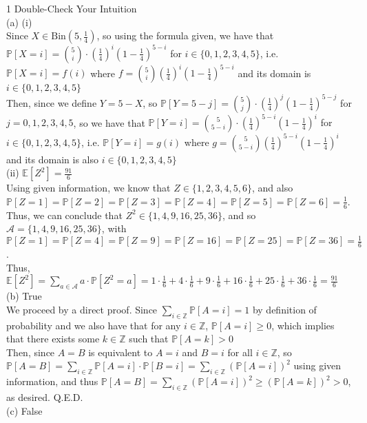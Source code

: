\documentclass{article}
\begin{document}
{\Large 1 Double-Check Your Intuition} \\[.5cm]
{\color{red} (a) (i) } \\

Since $X \in \text{Bin}(5, \frac{1}{4})$, so using the formula given, we have that
{\color{red} $\mathbb{P}[X=i] = \binom{5}{i}\cdot (\frac{1}{4})^i(1 - \frac{1}{4})^{5-i}$ for $i\in \{0,1,2,3,4,5\}$}, i.e.
$\mathbb{P}[X=i] = f(i)$ where $f = \binom{5}{i} (\frac{1}{4})^i(1 - \frac{1}{4})^{5-i}$ and its domain is $i\in \{0,1,2,3,4,5\}$ \\

Then, since we define $Y = 5 - X$, so
$\mathbb{P}[Y=5-j] = \binom{5}{j}\cdot (\frac{1}{4})^j(1 - \frac{1}{4})^{5-j}$ for $j = 0,1,2,3,4,5$, so we have that
{\color{red} $\mathbb{P}[Y=i] = \binom{5}{5-i}\cdot (\frac{1}{4})^{5-i}(1 - \frac{1}{4})^{i}$ for $i\in \{0,1,2,3,4,5\}$}, i.e.
$\mathbb{P}[Y=i] = g(i)$ where $g = \binom{5}{5-i} (\frac{1}{4})^{5-i}(1 - \frac{1}{4})^{i}$ and its domain is also $i\in \{0,1,2,3,4,5\}$ \\[.5cm]
{\color{red} (ii) $\mathbb{E}[Z^2] = \frac{91}{6}$} \\

Using given information, we know that $Z\in\{1,2,3,4,5,6\}$, and also
$\mathbb{P}[Z = 1] =
\mathbb{P}[Z = 2] =
\mathbb{P}[Z = 3] =
\mathbb{P}[Z = 4] =
\mathbb{P}[Z = 5] =
\mathbb{P}[Z = 6] = \frac{1}{6}$.
Thus, we can conclude that $Z^2 \in \{1,4,9,16,25,36\}$, and so $\mathscr{A} = \{1,4,9,16,25,36\}$, with
$\mathbb{P}[Z = 1] =
\mathbb{P}[Z = 4] =
\mathbb{P}[Z = 9] =
\mathbb{P}[Z = 16] =
\mathbb{P}[Z = 25] =
\mathbb{P}[Z = 36] = \frac{1}{6}$. \\

Thus, $\mathbb{E}[Z^2] = \sum\limits_{a\in\mathscr{A}} a\cdot\mathbb{P}[Z^2 = a] =
1\cdot\frac{1}{6} + 4\cdot\frac{1}{6} + 9\cdot\frac{1}{6} + 16\cdot\frac{1}{6} + 25\cdot\frac{1}{6} + 36\cdot\frac{1}{6} =
\frac{91}{6}$ \\[.5cm]
{\color{red} (b) True} \\

We proceed by a direct proof. Since $\sum\limits_{i\in\mathbb{Z}} \mathbb{P}[A = i] = 1$ by definition of probability and we also have that for any $i\in\mathbb{Z}$, $\mathbb{P}[A = i] \geq 0$, which implies that there exists some $k\in\mathbb{Z}$ such that $\mathbb{P}[A = k] > 0$ \\

Then, since $A = B$ is equivalent to $A = i$ and $B = i$ for all $i\in\mathbb{Z}$, so $\mathbb{P}[A = B] = \sum\limits_{i\in\mathbb{Z}} \mathbb{P}[A = i] \cdot \mathbb{P}[B = i] =
\sum\limits_{i\in\mathbb{Z}} (\mathbb{P}[A = i])^2$ using given information, and thus
$\mathbb{P}[A = B] =
\sum\limits_{i\in\mathbb{Z}} (\mathbb{P}[A = i])^2 \geq
(\mathbb{P}[A = k])^2 > 0$, as desired. Q.E.D. \\[.5cm]
{\color{red} (c) False} \\
\end{document}
